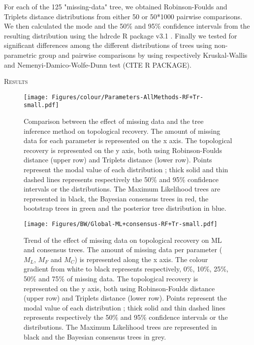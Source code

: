 \documentclass[12pt,letterpaper]{article}
\renewcommand{\section}[1]{%
\bigskip
\begin{center}
\begin{Large}
\normalfont\scshape #1
\medskip
\end{Large}
\end{center}}
\begin{document}
For each of the 125 "missing-data" tree, we obtained Robinson-Foulds and Triplets distance distributions from either 50 or 50*1000 pairwise comparisons. We then calculated the mode and the 50\% and 95\% confidence intervals from the resulting distribution using the hdrcde R package v3.1 \citep{hdrcde}. Finally we tested for significant differences among the different distributions of trees using non-parametric group and pairwise comparisons by using respectively Kruskal-Wallis and Nemenyi-Damico-Wolfe-Dunn test (CITE R PACKAGE)\citet{ruxtontime2008}.


%
%


\section{Results}

\begin{figure} 
\centering
    \texttt{[image: Figures/colour/Parameters-AllMethods-RF+Tr-small.pdf]}
\caption{Comparison between the effect of missing data and the tree inference method on topological recovery. The amount of missing data for each parameter is represented on the x axis. The topological recovery is represented on the y axis, both using Robinson-Foulds distance (upper row) and Triplets distance (lower row). Points represent the modal value of each distribution ; thick solid and thin dashed lines represents respectively the 50\% and 95\% confidence intervals or the distributions. The Maximum Likelihood trees are represented in black, the Bayesian consensus trees in red, the bootstrap trees in green and the posterior tree distribution in blue.}
\label{Fig_Results_1} %
\end{figure}

\begin{figure} 
\centering
    \texttt{[image: Figures/BW/Global-ML+consensus-RF+Tr-small.pdf]}
\caption{Trend of the effect of missing data on topological recovery on ML and consensus trees. The amount of missing data per parameter ($M_{L}$, $M_{F}$ and $M_{C}$) is represented along the x axis. The colour gradient from white to black represents respectively, 0\%, 10\%, 25\%, 50\% and 75\% of missing data. The topological recovery is represented on the y axis, both using Robinson-Foulds distance (upper row) and Triplets distance (lower row). Points represent the modal value of each distribution ; thick solid and thin dashed lines represents respectively the 50\% and 95\% confidence intervals or the distributions. The Maximum Likelihood trees are represented in black and the Bayesian consensus trees in grey.}
\label{Fig_Results_2} %
\end{figure}
\end{document}
